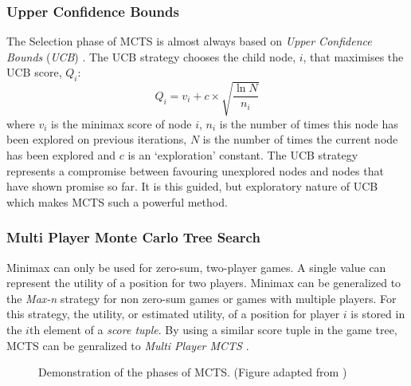 \subsubsection{Upper Confidence Bounds}
The {Selection} phase of {MCTS} is almost always based on \textit{Upper Confidence Bounds} (\textit{UCB}) \cite{survey}. The {UCB} strategy chooses the child node, $i$, that maximises the {UCB} score, $Q_{i}$:
\begin{equation}
\label{eq:ucb}
Q_{i} = v_{i}+c\times\sqrt{\frac{\ln{N}}{n_{i}}}
\nonumber
\end{equation}
where $v_{i}$ is the {minimax} score of node $i$, $n_{i}$ is the number of times this node has been explored on previous iterations, $N$ is the number of times the current node has been explored and $c$ is an `exploration' constant. The {UCB} strategy represents a compromise between favouring unexplored nodes and nodes that have shown promise so far. It is this guided, but exploratory nature of {UCB} which makes {MCTS} such a powerful method.

\subsubsection{Multi Player Monte Carlo Tree Search}
{Minimax} can only be used for zero-sum, two-player games. A single value can 
represent the utility of a position for two players. {Minimax} can be generalized to 
the \textit{Max-n} strategy for non zero-sum games or games with multiple players. For this 
strategy, the utility, or estimated utility, of a position for player $i$ is stored in the $i$th element 
of a \textit{score tuple}. By using a similar {score tuple} in the game tree, {MCTS} can be genralized to \textit{Multi Player MCTS} \cite{cazenave08}.

\begin{figure}[]
\centering
\scalebox{0.4}{}
\caption{\label{fig:annoying}Demonstration of the phases of {MCTS}. (Figure adapted from \cite{bouzy2007})}
\end{figure}

